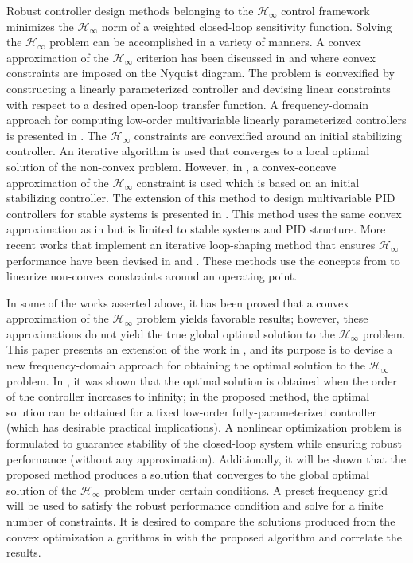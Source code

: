 \documentclass[letterpaper, 10 pt, conference]{ieeeconf}  %
\begin{document}
Robust controller design methods belonging to the $\mathcal{H}_{\infty}$ control framework minimizes the $\mathcal{H}_{\infty}$ norm of a weighted closed-loop sensitivity function. Solving the $\mathcal{H}_{\infty}$ problem can be accomplished in a variety of manners. A convex approximation of the $\mathcal{H}_\infty$ criterion has been discussed in \cite{KG10} and \cite{KGL08} where convex constraints are imposed on the Nyquist diagram. The problem is convexified by constructing a linearly parameterized controller and devising linear constraints with respect to a desired open-loop transfer function.  A frequency-domain approach for computing low-order multivariable linearly parameterized controllers is presented in \cite{SOW10}. The $\mathcal{H}_{\infty}$ constraints are convexified around an initial stabilizing controller. An iterative algorithm is used that converges to a local optimal solution of the non-convex problem. However, in \cite{HAB13},  a convex-concave approximation of the $\mathcal{H}_{\infty}$ constraint is used which is based on an initial stabilizing controller. The extension of this method to design multivariable PID controllers for stable systems is presented in \cite{BHA16}. This method uses the same convex approximation as in  \cite{SOW10} but is limited to stable systems and PID structure. More recent works that implement an iterative loop-shaping method that ensures $\mathcal{H}_{\infty}$ performance have been devised in \cite{UYY16} and \cite{KK16_2}. These methods use the concepts from \cite{BHA16} to linearize non-convex constraints around an operating point. 

In some of the works asserted above, it has been proved that a convex approximation of the $\mathcal{H}_{\infty}$ problem yields favorable results; however, these approximations do not yield the true global optimal solution to the $\mathcal{H}_{\infty}$ problem. This paper presents an extension of the work in \cite{KNZ16}, and its purpose is to devise a new frequency-domain approach for obtaining the optimal solution to the $\mathcal{H}_{\infty}$ problem. In \cite{KNZ16}, it was shown that the optimal solution is obtained when the order of the controller increases to infinity; in the proposed method, the optimal solution can be obtained for a fixed low-order fully-parameterized controller (which has desirable practical implications). A nonlinear optimization problem is formulated to guarantee stability of the closed-loop system while ensuring robust performance (without any approximation). Additionally, it will be shown that the proposed method produces a solution that converges to the global optimal solution of the $\mathcal{H}_{\infty}$ problem under certain conditions. A preset frequency grid will be used to satisfy the robust performance condition and solve for a finite number of constraints. It is desired to compare the solutions produced from the convex optimization algorithms in \cite{KNZ16} with the proposed algorithm and correlate the results. 
 
\end{document}
